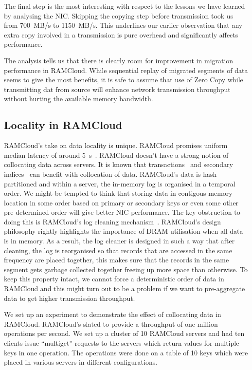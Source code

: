 The final step is the most interesting with respect to the lessons we have learned by analysing the NIC. Skipping the copying step before transmission took us from 700~MB/s to 
1150~MB/s. This underlines our earlier observation that any extra copy involved in a transmission is pure overhead and significantly affects performance. 

The analysis tells us that there is clearly room for improvement in migration performance in RAMCloud. While sequential replay of migrated segments of data seems to give the most benefits, 
it is safe to assume that use of Zero Copy while transmitting dat from source will enhance network transmission throughput without hurting the available memory bandwidth.


\subsection{Locality in RAMCloud}
RAMCloud's take on data locality is unique. RAMCloud promises uniform median latency of around 5\textmu~s~\cite{ramcloud}. RAMCloud doesn't have a strong notion of collocating data across servers. 
It is known that transactions~\cite{ramcloudtx} and secondary indices~\cite{slik} can benefit with collocation of data. RAMCloud's data is hash partitioned and within a server, the in-memory log is organised 
in a temporal order. We might be tempted to think that storing data in contigous memory location in some order based on primary or secondary keys or even some other pre-determined order will give better NIC performance. 
The key obstruction to doing this is RAMCloud's log cleaning mechanism~\cite{ramcloudfast}. RAMCloud's design philosophy rightly highlights the importance of DRAM utilisation when all data is in memory. 
As a result, the log cleaner is designed in such a way that after cleaning, the log is reorganised so that records that are accessed in the same frequency are placed together, this makes sure that the records in the same 
segment gets garbage collected together freeing up more space than otherwise. To keep this property intact, we cannot force a deterministic order of data in RAMCloud and this might turn out to be a problem if 
we want to pre-aggregate data to get higher transmission throughput.

We set up an experiment to demonstrate the effect of collocating data in RAMCloud. RAMCloud's slated to provide a throughput of one million operations per second. We set up a cluster of 10 RAMCloud servers 
and had ten clients issue ``multiget'' requests to the servers which return values for multiple keys in one operation. The operations were done on a table of 10 keys which were placed in various servers in different 
configurations. 

